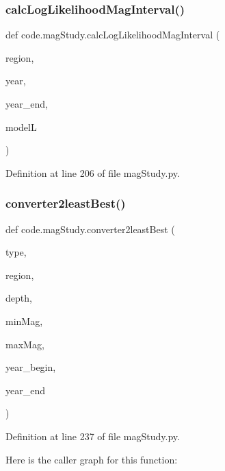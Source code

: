 \subsubsection{\texorpdfstring{calc\+Log\+Likelihood\+Mag\+Interval()}{calcLogLikelihoodMagInterval()}}
{\footnotesize\ttfamily def code.\+mag\+Study.\+calc\+Log\+Likelihood\+Mag\+Interval (\begin{DoxyParamCaption}\item[{}]{region,  }\item[{}]{year,  }\item[{}]{year\+\_\+end,  }\item[{}]{modelL }\end{DoxyParamCaption})}



Definition at line 206 of file mag\+Study.\+py.

\mbox{\label{namespacecode_1_1mag_study_a43dce4cb5ac4f0c4ff997b2f41b74616}} 
\subsubsection{\texorpdfstring{converter2least\+Best()}{converter2leastBest()}}
{\footnotesize\ttfamily def code.\+mag\+Study.\+converter2least\+Best (\begin{DoxyParamCaption}\item[{}]{type,  }\item[{}]{region,  }\item[{}]{depth,  }\item[{}]{min\+Mag,  }\item[{}]{max\+Mag,  }\item[{}]{year\+\_\+begin,  }\item[{}]{year\+\_\+end }\end{DoxyParamCaption})}



Definition at line 237 of file mag\+Study.\+py.

Here is the caller graph for this function\+:
\mbox{\label{namespacecode_1_1mag_study_a0419754de8467346b760c016ff46293f}} 
